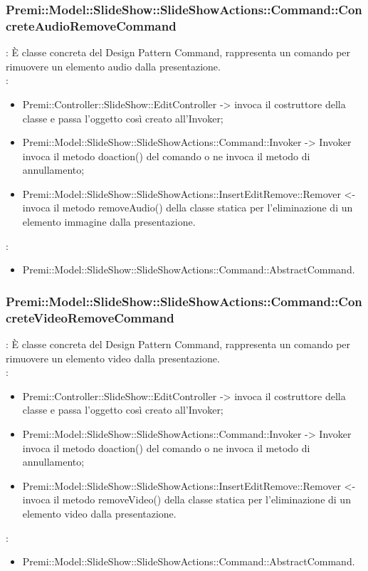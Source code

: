 {                    \subsubsection{Premi::Model::SlideShow::SlideShowActions::Command::ConcreteAudioRemoveCommand}{
				\textbf{\tipo}: È classe concreta del Design Pattern Command, rappresenta un comando per rimuovere un elemento audio dalla presentazione.\\	
				\textbf{\relaz}: 
				\begin{itemize}
					\item Premi::Controller::SlideShow::EditController -> invoca il costruttore della classe e passa l’oggetto così creato all’Invoker;
					\item Premi::Model::SlideShow::SlideShowActions::Command::Invoker -> Invoker invoca il metodo doaction() del comando o ne invoca il metodo di annullamento;
                    \item Premi::Model::SlideShow::SlideShowActions::InsertEditRemove::Remover <- invoca il metodo removeAudio() della classe statica per l’eliminazione di un elemento immagine dalla presentazione.
				\end{itemize}	
                \textbf{\base}: 
                    \begin{itemize}
                    \item Premi::Model::SlideShow::SlideShowActions::Command::AbstractCommand.
                    \end{itemize}
                    }
                    \subsubsection{Premi::Model::SlideShow::SlideShowActions::Command::ConcreteVideoRemoveCommand}{
				\textbf{\tipo}: È classe concreta del Design Pattern Command, rappresenta un comando per rimuovere un elemento video dalla presentazione.\\	
				\textbf{\relaz}: 
				\begin{itemize}
					\item Premi::Controller::SlideShow::EditController -> invoca il costruttore della classe e passa l’oggetto così creato all’Invoker;
					\item Premi::Model::SlideShow::SlideShowActions::Command::Invoker -> Invoker invoca il metodo doaction() del comando o ne invoca il metodo di annullamento;
                    \item Premi::Model::SlideShow::SlideShowActions::InsertEditRemove::Remover <- invoca il metodo removeVideo() della classe statica per l’eliminazione di un elemento video dalla presentazione.
				\end{itemize}
                \textbf{\base}: 
                    \begin{itemize}
                    \item Premi::Model::SlideShow::SlideShowActions::Command::AbstractCommand.
                    \end{itemize}
                    }
}
